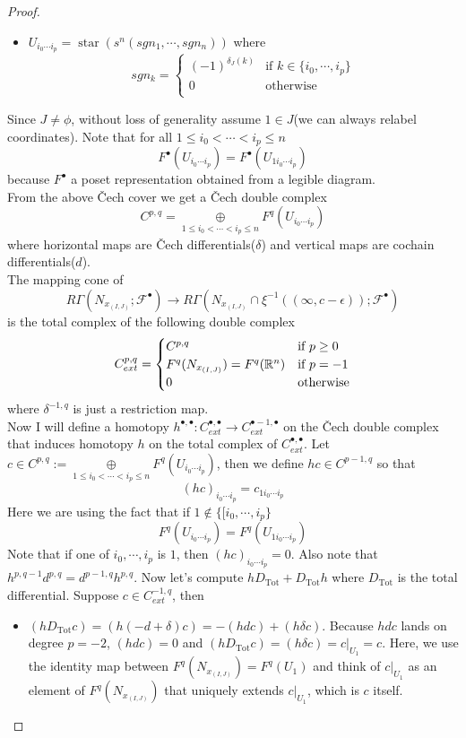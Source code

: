 \begin{proof}
\begin{itemize}
\item $U_{i_0\cdots i_p} = \operatorname{star}(s^n(sgn_1,\cdots, sgn_n))$ where
\[
sgn_k=
\begin{cases}
    (-1)^{\delta_J(k)} & \text{if } k\in \{i_0,\cdots,i_p\}\\
    0 & \text{otherwise}\\
\end{cases}
\]
\end{itemize}
Since $J\neq \phi$, without loss of generality assume $1\in J$(we can always relabel coordinates). Note that for all $1\leq i_0 <\cdots<i_p\leq n$
\[
F^\bullet(U_{i_0\cdots i_p}) = F^\bullet(U_{1i_0\cdots i_p})
\]
because $F^\bullet$ a poset representation obtained from a legible diagram.\\
From the above \v{C}ech cover we get a \v{C}ech double complex
\[
C^{p,q} = \underset{1\leq i_0<\cdots < i_p \leq n}{\oplus} F^q(U_{i_0\cdots i_p})
\]
where horizontal maps are \v{C}ech differentials($\delta$) and vertical maps are cochain differentials($d$).\\
The mapping cone of 
\[R\Gamma(N_{x_{(I,J)}};\mathscr{F}^\bullet) \rightarrow R\Gamma(N_{x_{(I,J)}} \cap \xi^{-1}((\infty,c-\epsilon));\mathscr{F}^\bullet)
\]
is the total complex of the following double complex
\[
C_{ext}^{p,q}=
\begin{cases}
    C^{p,q} & \text{if } p\geq 0\\
    F^q(N_{x_{(I,J)}}) = F^q(\mathbb{R}^n) & \text{if } p=-1\\
    0 & \text{otherwise}\\
\end{cases}
\]
where $\delta^{-1,q}$ is just a restriction map.\\
Now I will define a homotopy $h^{\bullet,\bullet} : C_{ext}^{\bullet,\bullet} \rightarrow C_{ext}^{\bullet -1,\bullet}$ on the \v{C}ech double complex that induces homotopy $h$ on the total complex of $C_{ext}^{\bullet,\bullet}$.
Let $c\in C^{p,q}:= \underset{1\leq i_0 < \cdots< i_p \leq n}{\oplus} F^q(U_{i_0\cdots i_p})$, then we define $hc \in C^{p-1,q}$ so that 
\[
(hc)_{i_0\cdots i_p} = c_{1i_0\cdots i_p}
\]
Here we are using the fact that if $1 \not\in \{[i_0,\cdots,i_p\}$ 
\[
F^q(U_{i_0\cdots i_p}) = F^q(U_{1i_0\cdots i_p})
\]
Note that if one of $i_0,\cdots, i_p$ is $1$, then $(hc)_{i_0\cdots i_p}=0$. Also note that $h^{p,q-1} d^{p,q} = d^{p-1,q} h^{p,q}$.
Now let's compute $h D_{\operatorname{Tot}} + D_{\operatorname{Tot}}h$ where $D_{\operatorname{Tot}}$ is the total differential. Suppose $c\in C_{ext}^{-1,q}$, then
\begin{itemize}
\item $(hD_{\operatorname{Tot}}c) = (h(-d+\delta)c) = -(hdc) + (h\delta c)$. Because $hdc$ lands on degree $p=-2$, $(hdc)=0$ and $(hD_{\operatorname{Tot}}c)=(h\delta c) = c|_{U_1}=c$. Here, we use the identity map between $F^q(N_{x_{(I,J)}}) = F^q(U_1)$ and think of $c|_{U_1}$ as an element of $F^q(N_{x_{(I,J)}})$ that uniquely extends $c|_{U_1}$, which is $c$ itself.


\end{itemize}
\end{proof}
